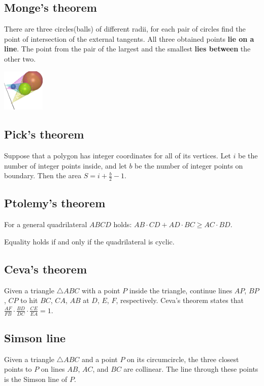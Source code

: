 \subsection*{Monge's theorem}
There are three circles(balls) of different radii, 
for each pair of circles find the point of intersection of the external tangents. 
All three obtained points \textbf{lie on a line}. 
The point from the pair of the largest and the smallest \textbf{lies between} the other two.

\begin{center}
  \includegraphics[width=0.15\textwidth, center]{content/mathematics/monges-theorem.png}
\end{center}

\subsection*{Pick's theorem}
Suppose that a polygon has integer coordinates for all of its vertices. 
Let $i$ be the number of integer points inside, and let $b$ be the number of integer points on boundary. 
Then the area $S = i + \tfrac{b}{2} - 1$.

\subsection*{Ptolemy's theorem}
For a general quadrilateral $ABCD$ holds:
$AB \cdot CD + AD \cdot BC \ge AC \cdot BD$.

Equality holds if and only if the quadrilateral is cyclic.

\subsection*{Ceva's theorem}
Given a triangle $\triangle ABC$ with a point $P$ inside the triangle,
continue lines $AP$, $BP$, $CP$ to hit $BC$, $CA$, $AB$ at $D$, $E$, $F$,
respectively.
Ceva's theorem states that
$\frac{AF}{FB} \cdot \frac{BD}{DC} \cdot \frac{CE}{EA} = 1$. 

\subsection*{Simson line}
Given a triangle $\triangle ABC$ and a point $P$ on its circumcircle,
the three closest points to $P$ on lines $AB$, $AC$, and $BC$ are collinear.
The line through these points is the Simson line of $P$.

